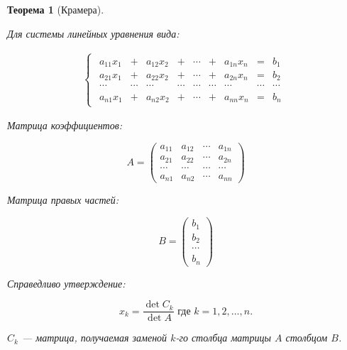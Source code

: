 \documentclass[a4paper,12pt]{extbook}
\newcommand{\newpar}{$ $\par\nobreak\ignorespaces}
\theoremstyle{numbered}
\theoremstyle{named}
\newtheorem*{theorem}{Теорема}
\theoremstyle{named}
\theoremstyle{named}
\begin{document}
\begin{theorem}[Крамера]
    \newpar
    Для системы линейных уравнения вида:

    \begin{gather*}
        \begin{cases}
            \begin{matrix}
                a_{11}x_1 & +      & a_{12}x_2 & +      & \cdots & +      & a_{1n}x_n & =      & b_1    \\
                a_{21}x_1 & +      & a_{22}x_2 & +      & \cdots & +      & a_{2n}x_n & =      & b_2    \\
                \cdots    & \cdots & \cdots    & \cdots & \cdots & \cdots & \cdots    & \cdots & \cdots \\
                a_{n1}x_1 & +      & a_{n2}x_2 & +      & \cdots & +      & a_{nn}x_n & =      & b_n
            \end{matrix}
        \end{cases}
    \end{gather*}

    Матрица коэффициентов:

    \begin{equation*}
        A = \left(
        \begin{array}{cccc}
            a_{11} & a_{12} & \cdots & a_{1n} \\
            a_{21} & a_{22} & \cdots & a_{2n} \\
            \cdots & \cdots & \cdots & \cdots \\
            a_{n1} & a_{n2} & \cdots & a_{nn}
        \end{array}
        \right)
    \end{equation*}

    Матрица правых частей:

    \begin{equation*}
        B = \left(
        \begin{array}{cccc}
            b_{1}  \\
            b_{2}  \\
            \cdots \\
            b_{n}
        \end{array}
        \right)
    \end{equation*}

    Справедливо утверждение:

    \begin{equation*}
        x_k = \frac{\det C_k}{\det A} \text{ где } k = 1, 2, \dots, n.
    \end{equation*}

    \(C_k\) — матрица, получаемая заменой \(k\)-го столбца матрицы \(A\) столбцом \(B\).
\end{theorem}
\end{document}
